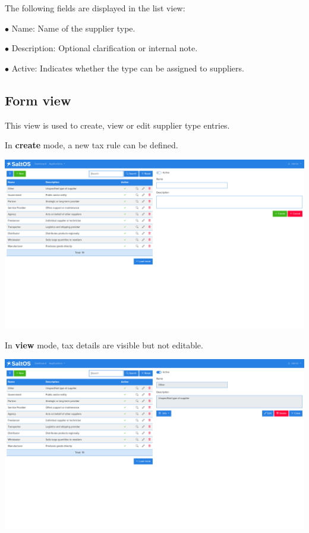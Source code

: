 \documentclass[a4paper]{article}
\begin{document}
The following fields are displayed in the list view:

\begin{compactitem}
\item[\color{myblue}$\bullet$] Name: Name of the supplier type.
\item[\color{myblue}$\bullet$] Description: Optional clarification or internal note.
\item[\color{myblue}$\bullet$] Active: Indicates whether the type can be assigned to suppliers.
\end{compactitem}

\hypertarget{toc134}{}
\subsection{Form view}

This view is used to create, view or edit supplier type entries.

In \textbf{create} mode, a new tax rule can be defined.

\begin{center}\includegraphics[width=1\textwidth]{../ujest/snaps/test-screenshots-js-screenshots-purchases-suppliers-types-create-en-us-1-snap.png}\end{center}

In \textbf{view} mode, tax details are visible but not editable.

\begin{center}\includegraphics[width=1\textwidth]{../ujest/snaps/test-screenshots-js-screenshots-purchases-suppliers-types-view-10-en-us-1-snap.png}\end{center}
\end{document}
